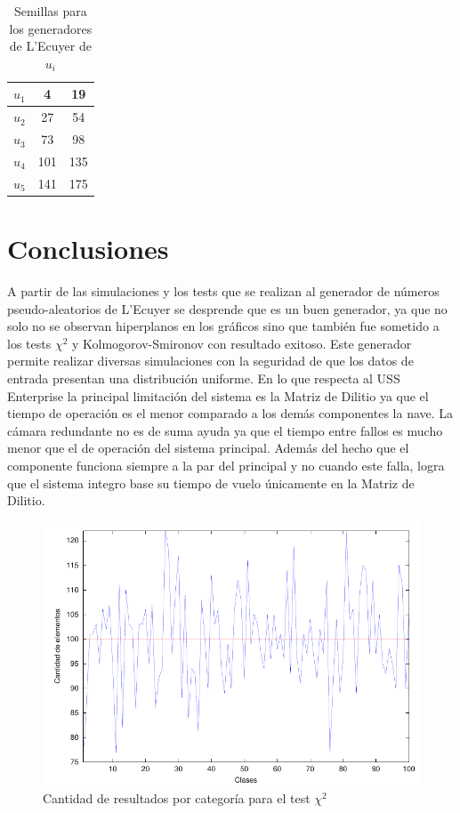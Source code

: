 \documentclass{sig-alternate}
\begin{document}
\begin{table}[h]
\label{seeds}
\centering
\begin{tabular}{|c|c|c|}
\hline
 $u_1$ & 4 & 19 \\
\hline
 $u_2$ & 27 & 54 \\
\hline
 $u_3$ & 73 & 98 \\
\hline
$u_4$ & 101 & 135 \\
\hline
$u_5$ & 141 & 175 \\
\hline
\end{tabular}
\caption{Semillas para los generadores de L'Ecuyer de $u_i$}
\end{table}


\section{Conclusiones}\label{conclusiones}

A partir de las simulaciones y los tests que se realizan al generador de n\'{u}meros 
pseudo-aleatorios de L'Ecuyer se desprende que es un buen generador, ya que no solo no 
se observan hiperplanos en los gr\'{a}ficos sino que tambi\'{e}n fue sometido a
los tests $\chi^{2}$ y Kolmogorov-Smironov con resultado exitoso. Este generador
permite realizar diversas simulaciones con la seguridad de que los datos de
entrada presentan una distribuci\'{o}n uniforme.
En lo que respecta al USS Enterprise la principal limitaci\'on del sistema es la 
Matriz de Dilitio ya que el tiempo de operaci\'on es el menor comparado a los dem\'as
componentes la nave. La c\'amara redundante no es de suma ayuda ya que el tiempo 
entre fallos es mucho menor que el de operaci\'on del sistema principal. Adem\'as 
del hecho que el componente funciona siempre a la par del principal y no 
cuando este falla, logra que el sistema integro base su tiempo de vuelo \'unicamente 
en la Matriz de Dilitio.

\begin{figure}[hp]
\centering
\includegraphics[scale=0.8]{graficos/clases}
\caption{Cantidad de resultados por categor\'{i}a para el test $\chi^{2}$}
\label{fig:clases}
\end{figure}
\end{document}
